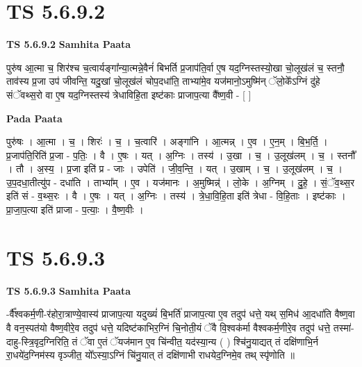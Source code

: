 \documentclass[17pt]{extarticle}
\begin{document}
\section*{ TS 5.6.9.2 }

\textbf{TS 5.6.9.2 } \newline
\textbf{Samhita Paata} \newline

पुरु॑ष आ॒त्मा च॒ शिर॑श्च च॒त्वार्यङ्गा᳚न्या॒त्मन्ने॒वैनं॑ बिभर्ति प्र॒जाप॑ति॒र्वा ए॒ष यद॒ग्निस्तस्यो॒खा चो॒लूख॑लं च॒ स्तनौ॒ ताव॑स्य प्र॒जा उप॑ जीवन्ति॒ यदु॒खां चो॒लूख॑लं चोप॒दधा॑ति॒ ताभ्या॑मे॒व यज॑मानो॒ऽमुष्मि॑न् ॅलो॒के᳚ऽग्निं दु॑हे संॅवथ्स॒रो वा ए॒ष यद॒ग्निस्तस्य॑ त्रेधाविहि॒ता इष्ट॑काः प्राजाप॒त्या वै᳚ष्ण॒वी - [  ] \newline

\textbf{Pada Paata} \newline

पुरु॑षः । आ॒त्मा । च॒ । शिरः॑ । च॒ । च॒त्वारि॑ । अङ्गा॑नि । आ॒त्मन्न् । ए॒व । ए॒न॒म् । बि॒भ॒र्ति॒ । प्र॒जाप॑ति॒रिति॑ प्र॒जा - प॒तिः॒ । वै । ए॒षः । यत् । अ॒ग्निः । तस्य॑ । उ॒खा । च॒ । उ॒लूख॑लम् । च॒ । स्तनौ᳚ । तौ । अ॒स्य॒ । प्र॒जा इति॑ प्र - जाः । उपेति॑ । जी॒व॒न्ति॒ । यत् । उ॒खाम् । च॒ । उ॒लूख॑लम् । च॒ । उ॒प॒दधा॒तीत्यु॑प - दधा॑ति । ताभ्या᳚म् । ए॒व । यज॑मानः । अ॒मुष्मिन्न्॑ । लो॒के । अ॒ग्निम् । दु॒हे॒ । सं॒ॅव॒थ्स॒र इति॑ सं - व॒थ्स॒रः । वै । ए॒षः । यत् । अ॒ग्निः । तस्य॑ । त्रे॒धा॒वि॒हि॒ता इति॑ त्रेधा - वि॒हि॒ताः । इष्ट॑काः । प्रा॒जा॒प॒त्या इति॑ प्राजा - प॒त्याः॒ । वै॒ष्ण॒वीः ।  \newline




\section*{ TS 5.6.9.3 }

\textbf{TS 5.6.9.3 } \newline
\textbf{Samhita Paata} \newline

-र्वै᳚श्वकर्म॒णी-र॑होरा॒त्राण्ये॒वास्य॑ प्राजाप॒त्या यदुख्यं॑ बि॒भर्ति॑ प्राजाप॒त्या ए॒व तदुप॑ धत्ते॒ यथ् स॒मिध॑ आ॒दधा॑ति वैष्ण॒वा वै वन॒स्पत॑यो वैष्ण॒वीरे॒व तदुप॑ धत्ते॒ यदिष्ट॑काभिर॒ग्निं चि॒नोती॒यं ॅवै वि॒श्वक॑र्मा वैश्वकर्म॒णीरे॒व तदुप॑ धत्ते॒ तस्मा॑-दाहु-स्त्रि॒वृद॒ग्निरिति॒ तं ॅवा ए॒तं ॅयज॑मान ए॒व चि॑न्वीत॒ यद॑स्या॒न्य ( ) श्चि॑नु॒याद्यत् तं दक्षि॑णाभि॒र्न रा॒धये॑द॒ग्निम॑स्य वृञ्जीत॒ यो᳚ऽस्या॒ऽग्निं चि॑नु॒यात् तं दक्षि॑णाभी राधयेद॒ग्निमे॒व तथ् स्पृ॑णोति ॥ \newline
\end{document}

